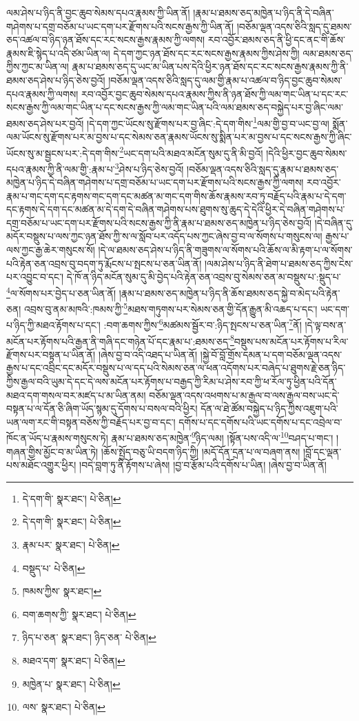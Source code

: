 ལམ་ཤེས་པ་ཉིད་ནི་བྱང་ཆུབ་སེམས་དཔའ་རྣམས་ཀྱི་ཡིན་ནོ། །རྣམ་པ་ཐམས་ཅད་མཁྱེན་པ་ཉིད་ནི་དེ་བཞིན་གཤེགས་པ་དགྲ་བཅོམ་པ་ཡང་དག་པར་རྫོགས་པའི་སངས་རྒྱས་ཀྱི་ཡིན་ནོ། །བཅོམ་ལྡན་འདས་ཅིའི་སླད་དུ་ཐམས་ཅད་འཚལ་བ་ཉིད་ཉན་ཐོས་དང་རང་སངས་རྒྱས་རྣམས་ཀྱི་ལགས། རབ་འབྱོར་ཐམས་ཅད་ནི་ཕྱི་དང་ནང་གི་ཆོས་རྣམས་ཇི་སྙེད་པ་འདི་ཙམ་ཡིན་ལ། དེ་དག་ཀྱང་ཉན་ཐོས་དང་རང་སངས་རྒྱས་རྣམས་ཀྱིས་ཤེས་ཀྱི། ལམ་ཐམས་ཅད་ཀྱིས་ཀྱང་མ་ཡིན་ལ། རྣམ་པ་ཐམས་ཅད་དུ་ཡང་མ་ཡིན་པས་དེའི་ཕྱིར་ཉན་ཐོས་དང་རང་སངས་རྒྱས་རྣམས་ཀྱི་ནི་ཐམས་ཅད་ཤེས་པ་ཉིད་ཅེས་བྱའོ། །བཅོམ་ལྡན་འདས་ཅིའི་སླད་དུ་ལམ་གྱི་རྣམ་པ་འཚལ་བ་ཉིད་བྱང་ཆུབ་སེམས་དཔའ་རྣམས་ཀྱི་ལགས། རབ་འབྱོར་བྱང་ཆུབ་སེམས་དཔའ་རྣམས་ཀྱིས་ནི་ཉན་ཐོས་ཀྱི་ལམ་གང་ཡིན་པ་དང་རང་སངས་རྒྱས་ཀྱི་ལམ་གང་ཡིན་པ་དང་སངས་རྒྱས་ཀྱི་ལམ་གང་ཡིན་པའི་ལམ་ཐམས་ཅད་བསྐྱེད་པར་བྱ་ཞིང་ལམ་ཐམས་ཅད་ཤེས་པར་བྱའོ། །དེ་དག་ཀྱང་ཡོངས་སུ་རྫོགས་པར་བྱ་ཞིང་:དེ་དག་གིས་\footnote{དེ་དག་གི་  སྣར་ཐང་།  པེ་ཅིན། }ལམ་གྱི་བྱ་བ་ཡང་བྱ་ལ། སྨོན་ལམ་ཡོངས་སུ་རྫོགས་པར་མ་བྱས་པ་དང་སེམས་ཅན་རྣམས་ཡོངས་སུ་སྨིན་པར་མ་བྱས་པ་དང་སངས་རྒྱས་ཀྱི་ཞིང་ཡོངས་སུ་མ་སྦྱངས་པར་:དེ་དག་གིས་\footnote{དེ་དག་གི་  སྣར་ཐང་།  པེ་ཅིན། }ཡང་དག་པའི་མཐའ་མངོན་སུམ་དུ་ནི་མི་བྱའོ། །དེའི་ཕྱིར་བྱང་ཆུབ་སེམས་དཔའ་རྣམས་ཀྱི་ནི་ལམ་གྱི་:རྣམ་པ་\footnote{རྣམ་པར་  སྣར་ཐང་།  པེ་ཅིན། }ཤེས་པ་ཉིད་ཅེས་བྱའོ། །བཅོམ་ལྡན་འདས་ཅིའི་སླད་དུ་རྣམ་པ་ཐམས་ཅད་མཁྱེན་པ་ཉིད་དེ་བཞིན་གཤེགས་པ་དགྲ་བཅོམ་པ་ཡང་དག་པར་རྫོགས་པའི་སངས་རྒྱས་ཀྱི་ལགས། རབ་འབྱོར་རྣམ་པ་གང་དག་དང་རྟགས་གང་དག་དང་མཚན་མ་གང་དག་གིས་ཆོས་རྣམས་རབ་ཏུ་བརྗོད་པའི་རྣམ་པ་དེ་དག་དང་རྟགས་དེ་དག་དང་མཚན་མ་དེ་དག་དེ་བཞིན་གཤེགས་པས་ཐུགས་སུ་ཆུད་དེ་དེའི་ཕྱིར་དེ་བཞིན་གཤེགས་པ་དགྲ་བཅོམ་པ་ཡང་དག་པར་རྫོགས་པའི་སངས་རྒྱས་ཀྱི་ནི་རྣམ་པ་ཐམས་ཅད་མཁྱེན་པ་ཉིད་ཅེས་བྱའོ། །དེ་བཞིན་དུ་མདོར་བསྡུས་པ་ལས་ཀྱང་ཉན་ཐོས་ཀྱི་ས་ལ་སློབ་པར་འདོད་པས་ཀྱང་ཞེས་བྱ་བ་ལ་སོགས་པ་གསུངས་ལ། རྒྱས་པ་ལས་ཀྱང་རྒྱ་ཆེར་གསུངས་སོ། །དེ་ལ་ཐམས་ཅད་ཤེས་པ་ཉིད་ནི་གཟུགས་ལ་སོགས་པའི་ཆོས་ལ་མི་རྟག་པ་ལ་སོགས་པའི་རྟེན་ཅན་འབྲས་བུ་བདག་ཏུ་རྨོངས་པ་སྤངས་པ་ཅན་ཡིན་ནོ། །ལམ་ཤེས་པ་ཉིད་ནི་ཐེག་པ་ཐམས་ཅད་ཀྱིས་ངེས་པར་འབྱུང་བ་དང་། དེ་ཁོ་ན་ཉིད་མངོན་སུམ་དུ་མི་བྱེད་པའི་རྟེན་ཅན་འབྲས་བུ་སེམས་ཅན་མ་བསྡུས་པ་:སྡུད་པ་\footnote{བསྡུད་པ་  པེ་ཅིན། }ལ་སོགས་པར་བྱེད་པ་ཅན་ཡིན་ནོ། །རྣམ་པ་ཐམས་ཅད་མཁྱེན་པ་ཉིད་ནི་ཆོས་ཐམས་ཅད་སྐྱེ་བ་མེད་པའི་རྟེན་ཅན། འབྲས་བུ་ནམ་མཁའི་:ཁམས་ཀྱི་\footnote{ཁམས་ཀྱིས་  སྣར་ཐང་། }མཐས་གཏུགས་པར་སེམས་ཅན་གྱི་དོན་རྒྱུན་མི་འཆད་པ་དང་། ཡང་དག་པ་ཉིད་ཀྱི་མཐའ་རྟོགས་པ་དང་། :བག་ཆགས་ཀྱིས་\footnote{བག་ཆགས་ཀྱི་  སྣར་ཐང་།  པེ་ཅིན། }མཚམས་སྦྱོར་བ་:ཉིད་སྤངས་པ་ཅན་ཡིན་\footnote{ཉིད་པ་ཅན་  སྣར་ཐང་། ཉིད་ཅན་  པེ་ཅིན། }ནོ། །དེ་ལྟ་བས་ན་མངོན་པར་རྟོགས་པའི་རྒྱན་ནི་གཞི་དང་གཉེན་པོ་དང་རྣམ་པ་:ཐམས་ཅད་\footnote{མཐའ་དག་  སྣར་ཐང་།  པེ་ཅིན། }བསྡུས་པས་མངོན་པར་རྟོགས་པ་རིལ་རྫོགས་པར་བསྟན་པ་ཡིན་ནོ། །ཞེས་བྱ་བ་འདི་འཐད་པ་ཡིན་ནོ། །སྐྱེ་བོ་བློ་གྲོས་དམན་པ་དག་བཅོམ་ལྡན་འདས་རྒྱས་པ་དང་འབྲིང་དང་མདོར་བསྡུས་པ་ལ་དད་པའི་སེམས་ཅན་ལ་ཕན་འདོགས་པར་བཞེད་པ་ཐུགས་རྗེ་ཅན་ཉིད་ཀྱིས་རྒྱལ་བའི་ཡུམ་དེ་དང་དེ་ལས་མངོན་པར་རྟོགས་པ་བརྒྱད་ཀྱི་རིམ་པ་ཤེས་རབ་ཀྱི་ཕ་རོལ་ཏུ་ཕྱིན་པའི་དོན་མཐའ་དག་གསལ་བར་མཛད་པ་མ་ཡིན་ནམ། བཅོམ་ལྡན་འདས་འཕགས་པ་མ་རྒྱལ་བ་ལས་རྒྱལ་བས་ཡང་དེ་བསྟན་པ་ལ་དོན་ཅི་ཞིག་ཡོད་སྙམ་དུ་དོགས་པ་བསལ་བའི་ཕྱིར། དོན་ལ་ཐེ་ཚོམ་བསྐྱེད་པ་ཉིད་ཀྱིས་འཇུག་པའི་ཡན་ལག་རང་གི་བསྟན་བཅོས་ཀྱི་བརྗོད་པར་བྱ་བ་དང་། དགོས་པ་དང་དགོས་པའི་ཡང་དགོས་པ་དང་འབྲེལ་བ་ཁོང་ན་ཡོད་པ་རྣམས་གསུངས་ཏེ། རྣམ་པ་ཐམས་ཅད་མཁྱེན་\footnote{མཁྱེན་པ་  སྣར་ཐང་།  པེ་ཅིན། }ཉིད་ལམ། །སྟོན་པས་འདི་ལ་\footnote{ལས་  སྣར་ཐང་།  པེ་ཅིན། }བཤད་པ་གང་། །གཞན་གྱིས་མྱོང་བ་མ་ཡིན་ཏེ། །ཆོས་སྤྱོད་བཅུ་ཡི་བདག་ཉིད་ཀྱི། །མདོ་དོན་དྲན་པ་ལ་བཞག་ནས། །བློ་དང་ལྡན་པས་མཐོང་འགྱུར་ཕྱིར། །བདེ་བླག་ཏུ་ནི་རྟོགས་པ་ཞེས། །བྱ་བ་རྩོམ་པའི་དགོས་པ་ཡིན། །ཞེས་བྱ་བ་ཡིན་ནོ། 